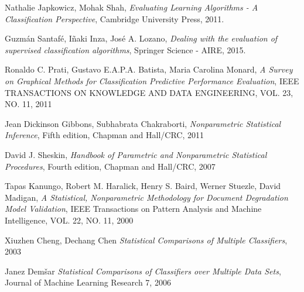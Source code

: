 \begin{thebibliography}{99}

  Nathalie Japkowicz, Mohak Shah,
  \emph{Evaluating Learning Algorithms - A Classification Perspective},
  Cambridge University Press,
  2011.

  Guzmán Santafé, Iñaki Inza, José A. Lozano,
  \emph{Dealing with the evaluation of supervised classification algorithms},
  Springer Science - AIRE,
  2015.
  
  Ronaldo C. Prati, Gustavo E.A.P.A. Batista, Maria Carolina Monard,
  \emph{A Survey on Graphical Methods for Classification Predictive Performance Evaluation},
  IEEE TRANSACTIONS ON KNOWLEDGE AND DATA ENGINEERING, VOL. 23, NO. 11,
  2011

  Jean Dickinson Gibbons, Subhabrata Chakraborti,
  \emph{Nonparametric Statistical Inference},
  Fifth edition,
  Chapman and Hall/CRC,
  2011
	
  David J. Sheskin,
  \emph{Handbook of Parametric and Nonparametric Statistical Procedures},
  Fourth edition,
  Chapman and Hall/CRC,
  2007
  
	Tapas Kanungo, Robert M. Haralick, Henry S. Baird, Werner Stuezle, David Madigan,
  \emph{A Statistical, Nonparametric Methodology for Document Degradation Model Validation},
  IEEE Transactions on Pattern Analysis and Machine Intelligence,
  VOL. 22, NO. 11,
  2000
  
	Xiuzhen Cheng, Dechang Chen
  \emph{Statistical Comparisons of Multiple Classifiers},
  2003
  
	Janez Dem\v{s}ar
	\emph{Statistical Comparisons of Classifiers over Multiple Data Sets},
	Journal of Machine Learning Research 7,
	2006
\end{thebibliography}